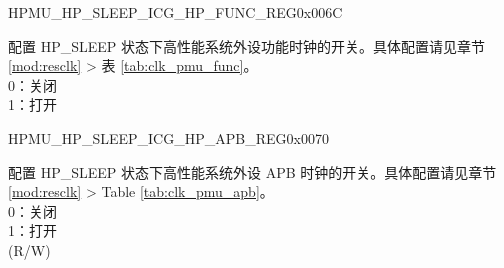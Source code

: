 \begin{register}{H}{PMU\_HP\_SLEEP\_ICG\_HP\_FUNC\_REG}{0x006C}\label{regdesc:PMUHPSLEEPICGHPFUNCREG}
%
\regnewline%
\begin{regdesc}\begin{reglist}
\label{fielddesc:PMUHPSLEEPDIGICGFUNCEN}\item [PMU\_HP\_SLEEP\_DIG\_ICG\_FUNC\_EN] 配置 HP\_SLEEP 状态下高性能系统外设功能时钟的开关。具体配置请见章节 \ref{mod:resclk} \textit{} > 表 \ref{tab:clk_pmu_func}。 \\
0：关闭\\
1：打开\\
\end{reglist}\end{regdesc}
\end{register}


\begin{register}{H}{PMU\_HP\_SLEEP\_ICG\_HP\_APB\_REG}{0x0070}\label{regdesc:PMUHPSLEEPICGHPAPBREG}
%
\regnewline%
\begin{regdesc}\begin{reglist}
\label{fielddesc:PMUHPSLEEPDIGICGAPBEN}\item [PMU\_HP\_SLEEP\_DIG\_ICG\_APB\_EN] 配置 HP\_SLEEP 状态下高性能系统外设 APB 时钟的开关。具体配置请见章节 \ref{mod:resclk} \textit{} > Table \ref{tab:clk_pmu_apb}。 \\
0：关闭\\
1：打开\\
(R/W)
\end{reglist}\end{regdesc}
\end{register}



